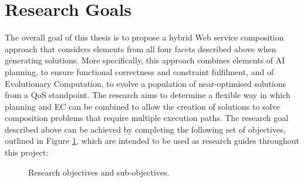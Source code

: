 \section{Research Goals}
The overall goal of this thesis is to propose a hybrid  Web service composition approach that considers elements from all four facets described above when generating solutions. More specifically, this approach combines elements of AI planning, to ensure functional correctness and constraint fulfilment, and of Evolutionary Computation, to evolve a population of near-optimised solutions from a QoS standpoint. The research aims to determine a flexible way in which planning and EC can be combined to allow the creation of solutions to solve composition problems that require multiple execution paths. The research goal described above can be achieved by completing the following set of objectives, outlined in Figure \ref{fig:objectives}, which are intended to be used as research guides throughout this project:

 \begin{figure}
\centerline{
}
\caption{Research objectives and sub-objectives.}
\label{fig:objectives}
\end{figure}

